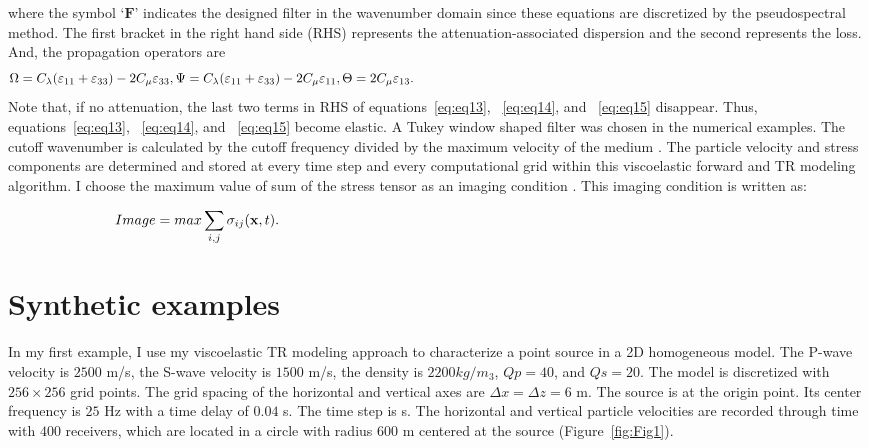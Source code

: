 where the symbol ‘$\mathbf F$’ indicates the designed filter in the wavenumber domain since these equations are discretized by the pseudospectral method. The first bracket in the right hand side (RHS) represents the attenuation-associated dispersion and the second represents the loss. And, the propagation operators are 
\begin{equation}
\label{eq:eq16}                      
\hspace{0pt} \Omega = C_\lambda (\varepsilon_{11}+\varepsilon_{33} ) - 2C_\mu\varepsilon_{33}, \Psi=C_\lambda (\varepsilon_{11}+\varepsilon_{33} ) - 2C_\mu\varepsilon_{11},  \Theta = 2C_\mu\varepsilon_{13}.\hspace{\linewidth minus\linewidth}
\end{equation}
Note that, if no attenuation, the last two terms in RHS of equations~\ref{eq:eq13}, ~\ref{eq:eq14}, and ~\ref{eq:eq15} disappear. Thus, equations~\ref{eq:eq13}, ~\ref{eq:eq14}, and ~\ref{eq:eq15} become elastic. A Tukey window shaped filter was chosen in the numerical examples. The cutoff wavenumber is calculated by the cutoff frequency divided by the maximum velocity of the medium \cite[]{zhu14b}.
The particle velocity and stress components are determined and stored at every time step and every computational grid within this viscoelastic forward and TR modeling algorithm. I choose the maximum value of sum of the stress tensor as an imaging condition \cite[]{saenger11}. This imaging condition is written as:

\begin{equation}
\label{eq:eq17}                      
\hspace{0pt} Image=max\sum_{i,j}\sigma _{ij}(\mathbf x, t).\hspace{\linewidth minus\linewidth}
\end{equation}

\section{Synthetic examples}

In my first example, I use my viscoelastic TR modeling approach to characterize a point source in a 2D homogeneous model. The P-wave velocity is $2500$ m/s, the S-wave velocity is $1500$ m/s, the density is $2200 kg/m_3$, $Qp=40$, and $Qs=20$. The model is discretized with $256\times 256$  grid points. The grid spacing of the horizontal and vertical axes are $\Delta x=\Delta z=6$ m. The source is at the origin point. Its center frequency is $25$ Hz with a time delay of $0.04$ s. The time step is  s. The horizontal and vertical particle velocities are recorded through time with $400$ receivers, which are located in a circle with radius $600$ m centered at the source (Figure~\ref{fig:Fig1}).

